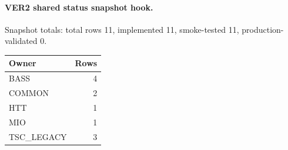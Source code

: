 \paragraph{VER2 shared status snapshot hook.}
Snapshot totals: total rows 11, implemented 11,
smoke-tested 11, production-validated 0.

\begin{center}
\begin{tabular}{lr}
\hline
Owner & Rows \\
\hline
BASS & 4 \\
COMMON & 2 \\
HTT & 1 \\
MIO & 1 \\
TSC\_LEGACY & 3 \\
\hline
\end{tabular}
\end{center}
